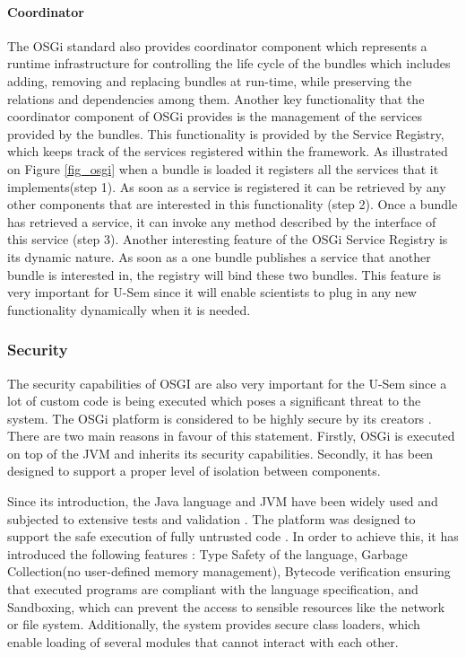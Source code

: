 \paragraph{Coordinator}
The OSGi standard also provides coordinator component which represents a runtime infrastructure for controlling the life cycle of the bundles which includes adding, removing and replacing bundles at run-time, while preserving the relations and dependencies among them. Another key functionality that the coordinator component of OSGi provides is the management of the services provided by the bundles. This functionality is provided by the Service Registry, which keeps track of the services registered within the framework. As illustrated on Figure \ref{fig_osgi} when a bundle is loaded it registers all the services that it implements(step 1). As soon as a service is registered it can be retrieved by any other components that are interested in this functionality (step 2). Once a bundle has retrieved a service, it can invoke any method described by the interface of this service (step 3). Another interesting feature of the OSGi Service Registry is its dynamic nature. As soon as a one bundle publishes a service that another bundle is interested in, the registry will bind these two bundles. This feature is very important for U-Sem since it will enable scientists to plug in any new functionality dynamically when it is needed.

\subsubsection{Security}

The security capabilities of OSGI are also very important for the U-Sem since a lot of custom code is being executed which poses a significant threat to the system. The OSGi platform is considered to be highly secure by its creators \cite{Parrend}. There are two main reasons in favour of this statement. Firstly, OSGi is executed on top of the JVM and inherits its security capabilities. Secondly, it has been designed to support a proper level of isolation between components.

Since its introduction, the Java language and JVM have been widely used and subjected to extensive tests and validation \cite{Parrend}. The platform was designed to support the safe execution of fully untrusted code \cite{Felten}. In order to achieve this, it has introduced the following features \cite{Gong}: Type Safety of the language, Garbage Collection(no user-defined memory management), Bytecode verification ensuring that executed programs are compliant with the language specification, and Sandboxing, which can prevent the access to sensible resources like the network or file system. Additionally, the system provides secure class loaders, which enable loading of several modules that cannot interact with each other.

